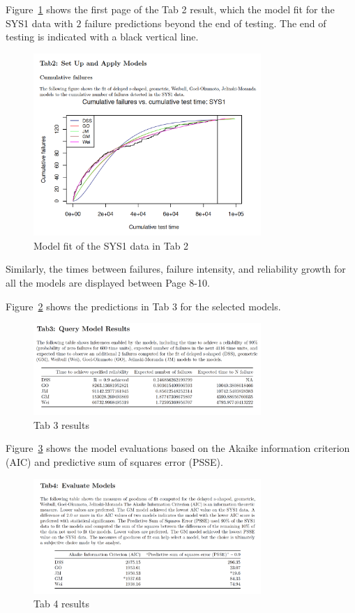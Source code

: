 \documentclass[conference]{IEEEtran}
\begin{document}
Figure~\ref{fig:SYS1Tab2} shows the first page of the Tab 2 result, which the model fit for the SYS1 data with $2$ failure predictions beyond the end of testing. The end of testing is indicated with a black vertical line.
\begin{figure}[!ht]
\centering
\includegraphics[width=3.4in]{Figures/SYS1Tab2}
\caption{Model fit of the SYS1 data in Tab 2}
\label{fig:SYS1Tab2}
\end{figure}

\noindent Similarly, the times between failures, failure intensity, and reliability growth for all the models are displayed between Page 8-10.


Figure~\ref{fig:SYS1Tab3} shows the predictions in Tab 3 for the selected models.
\begin{figure}[!ht]
\centering
\includegraphics[width=3.4in]{Figures/SYS1Tab3}
\caption{Tab 3 results}
\label{fig:SYS1Tab3}
\end{figure}


Figure~\ref{fig:SYS1Tab4} shows the model evaluations based on the Akaike information criterion (AIC) and predictive sum of squares error (PSSE).
\begin{figure}[!ht]
\centering
\includegraphics[width=3.4in]{Figures/SYS1Tab4}
\caption{Tab 4 results}
\label{fig:SYS1Tab4}
\end{figure}
\end{document}
